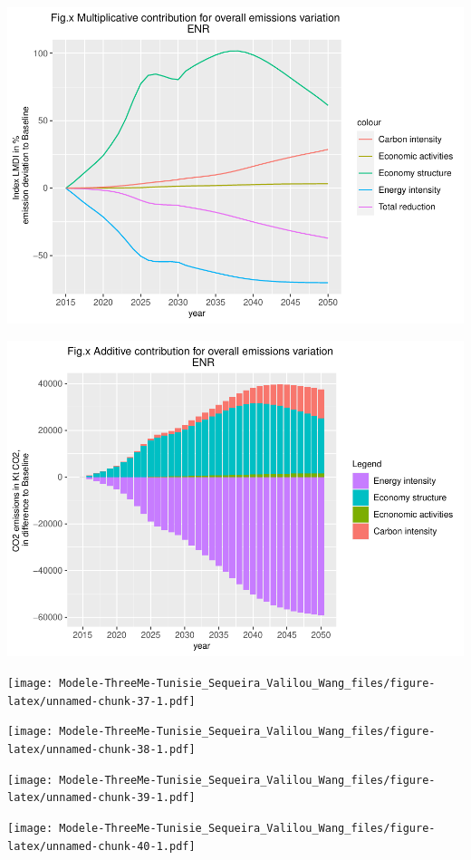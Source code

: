 \documentclass[
]{article}
\begin{document}
\includegraphics{Modele-ThreeMe-Tunisie_Sequeira_Valilou_Wang_files/figure-latex/unnamed-chunk-35-1.pdf}

\includegraphics{Modele-ThreeMe-Tunisie_Sequeira_Valilou_Wang_files/figure-latex/unnamed-chunk-36-1.pdf}

\texttt{[image: Modele-ThreeMe-Tunisie\_Sequeira\_Valilou\_Wang\_files/figure-latex/unnamed-chunk-37-1.pdf]}

\texttt{[image: Modele-ThreeMe-Tunisie\_Sequeira\_Valilou\_Wang\_files/figure-latex/unnamed-chunk-38-1.pdf]}

\texttt{[image: Modele-ThreeMe-Tunisie\_Sequeira\_Valilou\_Wang\_files/figure-latex/unnamed-chunk-39-1.pdf]}

\texttt{[image: Modele-ThreeMe-Tunisie\_Sequeira\_Valilou\_Wang\_files/figure-latex/unnamed-chunk-40-1.pdf]}
\end{document}
